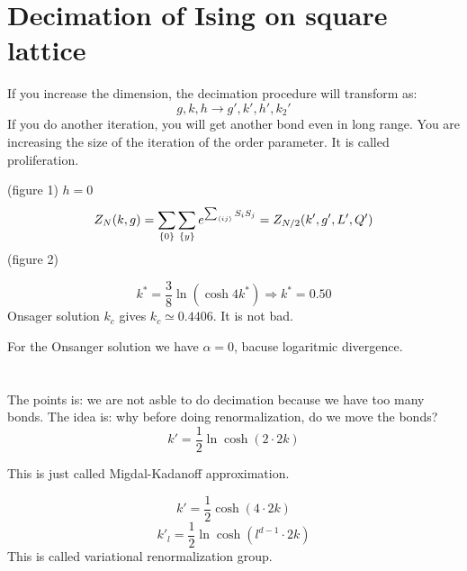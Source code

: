 \documentclass[../main/main.tex]{subfiles}
\begin{document}
\section{Decimation of Ising on square lattice}

If you increase the dimension, the decimation procedure will transform as:
\begin{equation}
  g,k,h \rightarrow g',k',h',k_2'
\end{equation}
If you do another iteration, you will get another bond even in long range. You are increasing the size of the iteration of the order parameter. It is called proliferation.

(figure 1)
\( h=0 \)
\begin{equation}
  Z_N (k,g) = \sum_{\{ 0 \}  }^{} \sum_{\{ y \}  }^{} e^{\sum_{\expval{ij} }^{} S_i S_j }
  = Z_{N/2} (k',g',L',Q')
\end{equation}
(figure 2)




\begin{equation}
  k^* = \frac{3}{8} \ln{(\cosh 4k^*)} \Rightarrow k^* = 0.50
\end{equation}
Onsager solution \( k_c \) gives \( k_c \simeq 0.4406 \). It is not bad.

For the Onsanger solution we have \( \alpha =0 \), bacuse logaritmic divergence.

\section{}
The points is: we are not asble to do decimation because we have too many bonds. The idea is: why before doing renormalization, do we move the bonds?
\begin{equation}
  k' = \frac{1}{2} \ln{ \cosh (2 \cdot 2k)}
\end{equation}

This is just called Migdal-Kadanoff approximation.


\begin{equation}
  k' = \frac{1}{2} \cosh (4 \cdot 2 k)
\end{equation}
\begin{equation}
  k'_l = \frac{1}{2} \ln \cosh (l^{d-1}\cdot 2k)
\end{equation}
This is called variational renormalization group.
\end{document}
